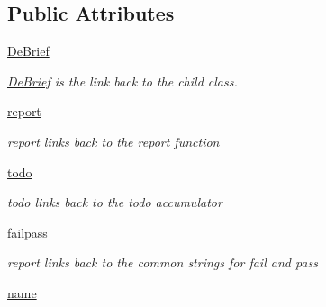 \subsection*{Public Attributes}
\begin{DoxyCompactItemize}
\item 
\hypertarget{classc_1_1_de_brief_1_1_de_brief___module_a8b07883bccac47ed74f1f0a5eea02459}{}\hyperlink{classc_1_1_de_brief_1_1_de_brief___module_a8b07883bccac47ed74f1f0a5eea02459}{De\+Brief}\label{classc_1_1_de_brief_1_1_de_brief___module_a8b07883bccac47ed74f1f0a5eea02459}

\begin{DoxyCompactList}\small\item\em \hyperlink{classc_1_1_de_brief_1_1_de_brief}{De\+Brief} is the link back to the child class. \end{DoxyCompactList}\item 
\hypertarget{classc_1_1_de_brief_1_1_de_brief___module_a307d6fe00c703fedaeab6adbda0de1ff}{}\hyperlink{classc_1_1_de_brief_1_1_de_brief___module_a307d6fe00c703fedaeab6adbda0de1ff}{report}\label{classc_1_1_de_brief_1_1_de_brief___module_a307d6fe00c703fedaeab6adbda0de1ff}

\begin{DoxyCompactList}\small\item\em report links back to the report function \end{DoxyCompactList}\item 
\hypertarget{classc_1_1_de_brief_1_1_de_brief___module_a37e109123d80b09299c7b8220d38b618}{}\hyperlink{classc_1_1_de_brief_1_1_de_brief___module_a37e109123d80b09299c7b8220d38b618}{todo}\label{classc_1_1_de_brief_1_1_de_brief___module_a37e109123d80b09299c7b8220d38b618}

\begin{DoxyCompactList}\small\item\em todo links back to the todo accumulator \end{DoxyCompactList}\item 
\hypertarget{classc_1_1_de_brief_1_1_de_brief___module_a43620205b0d0a9e03c59572567a565cb}{}\hyperlink{classc_1_1_de_brief_1_1_de_brief___module_a43620205b0d0a9e03c59572567a565cb}{failpass}\label{classc_1_1_de_brief_1_1_de_brief___module_a43620205b0d0a9e03c59572567a565cb}

\begin{DoxyCompactList}\small\item\em report links back to the common strings for fail and pass \end{DoxyCompactList}\item 
\hypertarget{classc_1_1_de_brief_1_1_de_brief___module_a1893f72f370cbd07d3e048cf60a6b379}{}\hyperlink{classc_1_1_de_brief_1_1_de_brief___module_a1893f72f370cbd07d3e048cf60a6b379}{name}\label{classc_1_1_de_brief_1_1_de_brief___module_a1893f72f370cbd07d3e048cf60a6b379}


\end{DoxyCompactItemize}
